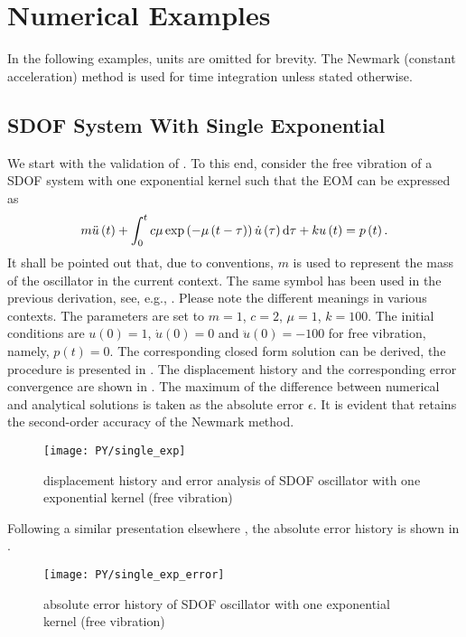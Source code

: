 \section{Numerical Examples}\label{sec:example}
In the following examples, units are omitted for brevity.
The Newmark (constant acceleration) method is used for time integration unless stated otherwise.
\subsection{SDOF System With Single Exponential}
We start with the validation of . To this end, consider the free vibration of a SDOF system with one exponential kernel such that the EOM can be expressed as
\begin{gather}
m\ddot{u}\left(t\right)+\int_0^tc\mu\exp\left(-\mu\left(t-\tau\right)\right)\dot{u}\left(\tau\right)\mathrm{d}\tau+ku\left(t\right)=p\left(t\right).
\end{gather}
It shall be pointed out that, due to conventions, $m$ is used to represent the mass of the oscillator in the current context. The same symbol has been used in the previous derivation, see, e.g., . Please note the different meanings in various contexts.
The parameters are set to $m=1$, $c=2$, $\mu=1$, $k=100$.
The initial conditions are $u\left(0\right)=1$, $\dot{u}\left(0\right)=0$ and $\ddot{u}\left(0\right)=-100$ for free vibration, namely, $p\left(t\right)=0$. The corresponding closed form solution can be derived, the procedure is presented in .
The displacement history and the corresponding error convergence are shown in .
The maximum of the difference between numerical and analytical solutions is taken as the absolute error $\epsilon$. It is evident that  retains the second-order accuracy of the Newmark method.
\begin{figure}[H]
\centering
\texttt{[image: PY/single\_exp]}
\caption{displacement history and error analysis of SDOF oscillator with one exponential kernel (free vibration)}\label{fig:sdof}
\end{figure}

Following a similar presentation elsewhere \citep{Liu2023}, the absolute error history is shown in .
\begin{figure}[H]
\centering
\texttt{[image: PY/single\_exp\_error]}
\caption{absolute error history of SDOF oscillator with one exponential kernel (free vibration)}\label{fig:sdof_error}
\end{figure}

